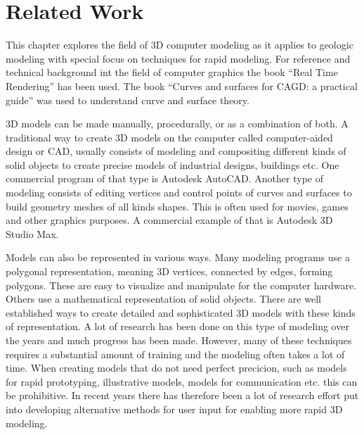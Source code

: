 \documentclass[a4paper,12pt]{report}
\begin{document}



\clearpage
\chapter{Related Work}
\label{sec:star}

This chapter explores the field of 3D computer modeling as it applies to geologic modeling with special focus on techniques for rapid modeling. For reference and technical background int the field of computer graphics the book ``Real Time Rendering'' \cite{moller2008real} has been used.  The book ``Curves and surfaces for CAGD: a practical guide'' \cite{farin2001curves} was used to understand curve and surface theory.

3D models can be made manually, procedurally, or as a combination of both. A traditional way to create 3D models on the computer called computer-aided design or CAD, usually consists of modeling and compositing different kinds of solid objects to create precise models of industrial designs, buildings etc. One commercial program of that type is Autodesk AutoCAD. Another type of modeling consists of editing vertices and control points of curves and surfaces to build geometry meshes of all kinds shapes. This is often used for movies, games and other graphics purposes. A commercial example of that is Autodesk 3D Studio Max.

Models can also be represented in various ways. Many modeling programs use a polygonal representation, meaning 3D vertices, connected by edges, forming polygons. These are easy to visualize and manipulate for the computer hardware.  Others use a mathematical representation of solid objects. There are well established ways to create detailed and sophisticated 3D models with these kinds of representation. A lot of research has been done on this type of modeling over the years and much progress has been made. However, many of these techniques requires a substantial amount of training and the modeling often takes a lot of time. When creating models that do not need perfect precicion, such as models for rapid prototyping, illustrative models, models for communication etc. this can be prohibitive. In recent years there has therefore been a lot of research effort put into developing alternative methods for user input for enabling more rapid 3D modeling.
\end{document}
